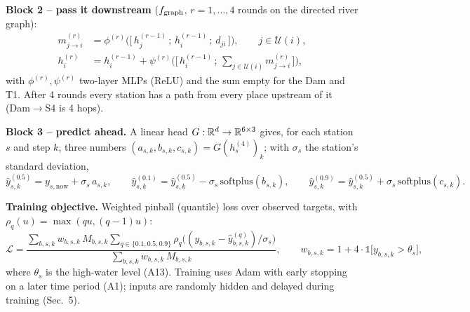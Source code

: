 \textbf{Block 2 -- pass it downstream} ($f_{\mathrm{graph}}$, $r=1,\dots,4$ rounds on the directed river graph):
\begin{align}
m^{(r)}_{j\to i} &= \phi^{(r)}\big(\big[\,h^{(r-1)}_j \,;\, h^{(r-1)}_i \,;\, d_{ji}\,\big]\big), \qquad j\in\mathcal U(i),\\
h^{(r)}_i &= h^{(r-1)}_i + \psi^{(r)}\Big(\Big[\,h^{(r-1)}_i \,;\, \textstyle\sum_{j\in\mathcal U(i)} m^{(r)}_{j\to i}\,\Big]\Big),
\end{align}
with $\phi^{(r)},\psi^{(r)}$ two-layer MLPs (ReLU) and the sum empty for the Dam and T1. After 4 rounds every station has a path from every place upstream of it (Dam$\to$S4 is 4 hops).

\textbf{Block 3 -- predict ahead.} A linear head $G:\mathbb{R}^{d}\to\mathbb{R}^{6\times3}$ gives, for each station $s$ and step $k$, three numbers $(a_{s,k},b_{s,k},c_{s,k})=G(h^{(4)}_s)_k$; with $\sigma_s$ the station's standard deviation,
\begin{equation}
\hat y^{(0.5)}_{s,k} = y_{s,\mathrm{now}} + \sigma_s\,a_{s,k},\qquad
\hat y^{(0.1)}_{s,k} = \hat y^{(0.5)}_{s,k} - \sigma_s\,\mathrm{softplus}(b_{s,k}),\qquad
\hat y^{(0.9)}_{s,k} = \hat y^{(0.5)}_{s,k} + \sigma_s\,\mathrm{softplus}(c_{s,k}).
\end{equation}

\textbf{Training objective.} Weighted pinball (quantile) loss over observed targets, with $\rho_q(u)=\max(qu,(q-1)u)$:
\begin{equation}
\mathcal L=\frac{\sum_{b,s,k} w_{b,s,k}\,M_{b,s,k}\sum_{q\in\{0.1,0.5,0.9\}}\rho_q\!\big((y_{b,s,k}-\hat y^{(q)}_{b,s,k})/\sigma_s\big)}{\sum_{b,s,k} w_{b,s,k}\,M_{b,s,k}},\qquad
w_{b,s,k}=1+4\cdot\mathbb 1\big[y_{b,s,k}>\theta_s\big],
\end{equation}
where $\theta_s$ is the high-water level (A13). Training uses Adam with early stopping on a later time period (A1); inputs are randomly hidden and delayed during training (Sec.~5).

